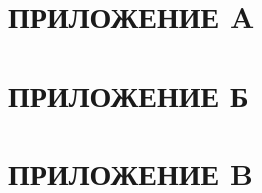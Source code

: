 \documentclass[14pt, a4paper] {extarticle}
\newcommand{\includecode}[3]{}
\begin{document}
	\newpage
    \section*{ПРИЛОЖЕНИЕ A}
        \includecode{c}{code/pkt_sched.diff}{Патч для заголовочного файла pkt\_sched.h.}

	\newpage
    \section*{ПРИЛОЖЕНИЕ Б}
        \includecode{c}{code/q_cbwfq.c}{Модуль CBWFQ для утилиты tc.}

	\newpage
    \section*{ПРИЛОЖЕНИЕ B}
        \includecode{c}{code/sch_cbwfq.c}{Модуль CBWFQ для ядра Linux.}
\end{document}
